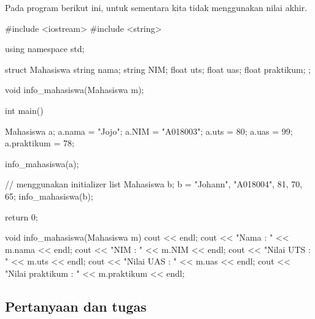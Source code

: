 \documentclass[a4paper,11pt]{extarticle}
\begin{document}
Pada program berikut ini, untuk sementara kita tidak menggunakan nilai akhir.

\begin{cppcode}
#include <iostream>
#include <string>

using namespace std;

struct Mahasiswa
{
  string nama;
  string NIM;
  float uts;
  float uas;
  float praktikum;
};

void info_mahasiswa(Mahasiswa m);

int main()
{
  Mahasiswa a;
  a.nama = "Jojo";
  a.NIM = "A018003";
  a.uts = 80;
  a.uas = 99;
  a.praktikum = 78;

  info_mahasiswa(a);

  // menggunakan initializer list
  Mahasiswa b;
  b = {"Johann", "A018004", 81, 70, 65};
  info_mahasiswa(b);

  return 0;
}

void info_mahasiswa(Mahasiswa m)
{
  cout << endl;
  cout << "Nama            : " << m.nama << endl;
  cout << "NIM             : " << m.NIM << endl;
  cout << "Nilai UTS       : " << m.uts << endl;
  cout << "Nilai UAS       : " << m.uas << endl;
  cout << "Nilai praktikum : " << m.praktikum << endl;
}
\end{cppcode}

\subsection*{Pertanyaan dan tugas}
\end{document}
